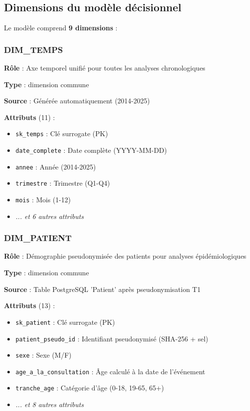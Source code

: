 \subsection{Dimensions du modèle décisionnel}

Le modèle comprend \textbf{9 dimensions} :

\subsubsection{DIM_TEMPS}

\textbf{Rôle} : Axe temporel unifié pour toutes les analyses chronologiques

\textbf{Type} : dimension commune

\textbf{Source} : Générée automatiquement (2014-2025)

\textbf{Attributs} (11) :
\begin{itemize}[leftmargin=*]
    \item \texttt{sk_temps} : Clé surrogate (PK)
    \item \texttt{date_complete} : Date complète (YYYY-MM-DD)
    \item \texttt{annee} : Année (2014-2025)
    \item \texttt{trimestre} : Trimestre (Q1-Q4)
    \item \texttt{mois} : Mois (1-12)
    \item \textit{... et 6 autres attributs}
\end{itemize}

\subsubsection{DIM_PATIENT}

\textbf{Rôle} : Démographie pseudonymisée des patients pour analyses épidémiologiques

\textbf{Type} : dimension commune

\textbf{Source} : Table PostgreSQL 'Patient' après pseudonymisation T1

\textbf{Attributs} (13) :
\begin{itemize}[leftmargin=*]
    \item \texttt{sk_patient} : Clé surrogate (PK)
    \item \texttt{patient_pseudo_id} : Identifiant pseudonymisé (SHA-256 + sel)
    \item \texttt{sexe} : Sexe (M/F)
    \item \texttt{age_a_la_consultation} : Âge calculé à la date de l'événement
    \item \texttt{tranche_age} : Catégorie d'âge (0-18, 19-65, 65+)
    \item \textit{... et 8 autres attributs}
\end{itemize}

